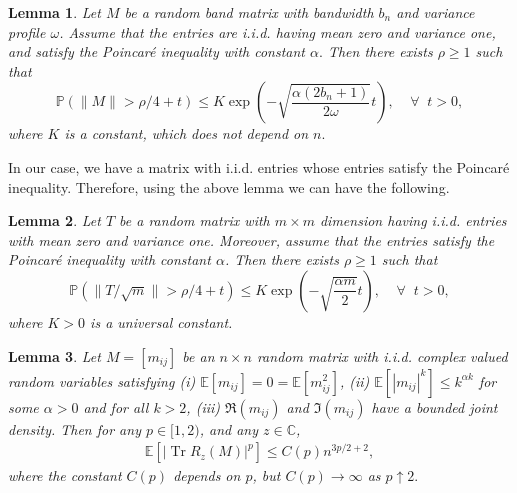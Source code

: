 \documentclass[12pt]{amsart}
\theoremstyle{plain}
\newtheorem{appendixlemma}{Lemma}[section]
\theoremstyle{definition}
\newcommand{\Tr}{\operatorname{Tr}}
\begin{document}
\begin{appendixlemma}{\cite[Lemma A.3]{jana2022clt}}
    Let $M$ be a random band matrix with bandwidth $b_n$ and variance profile $\omega$. Assume that the entries are i.i.d. having mean zero and variance one, and satisfy the Poincar\'e inequality with constant $\alpha.$ Then there exists $\rho\geq1$ such that 
    $$
    \mathbb{P}(\|M\|>\rho/4+t) \leq K \exp\left(-\sqrt{\frac{\alpha (2b_{n}+1)}{2\omega}}t\right),\;\;\;\; \forall \;\; t>0,
    $$
    where $K$ is a constant, which does not depend on $n.$
\end{appendixlemma}
In our case, we have a matrix with i.i.d. entries whose entries satisfy the Poincar\'e inequality. Therefore, using the above lemma we can have the following.
\begin{appendixlemma}\label{lemma:Norm bound}
    Let $T$ be a  random matrix with $m \times m$ dimension having i.i.d. entries with mean zero and variance one. Moreover, assume that the entries satisfy the Poincar\'e inequality with constant $\alpha$. Then there exists $\rho\geq1$ such that 
    $$
    \mathbb{P}(\|T/\sqrt{m}\|>\rho/4+t) \leq K \exp\left(-\sqrt{\frac{\alpha m}{2}}t\right),\;\;\;\; \forall \;\; t>0,
    $$
    where $K>0$ is a universal constant.
\end{appendixlemma}

\begin{appendixlemma}{\cite[Lemma 2.2 ]{rider2006gaussian}}\label{lemma: rider silverstein bound on trace of resolvent}
    Let $M=[m_{ij}]$ be an $n\times n$ random matrix with i.i.d. complex valued random variables satisfying (i) $\mathbb{E}[m_{ij}]=0=\mathbb{E}[m_{ij}^{2}]$, (ii) $\mathbb{E}[|m_{ij}|^{k}]\leq k^{\alpha k}$ for some $\alpha > 0$ and for all $k>2$, (iii) $\Re(m_{ij})$ and $\Im(m_{ij})$ have a bounded joint density. Then for any $p\in [1, 2)$, and any $z\in\mathbb{C}$,
    \begin{align*}
        \mathbb{E}[|\Tr R_{z}(M)|^{p}]\leq C(p)n^{3p/2 + 2},
    \end{align*}
    where the constant $C(p)$ depends on $p$, but $C(p)\to\infty$ as $p\uparrow 2.$
\end{appendixlemma}
\end{document}
